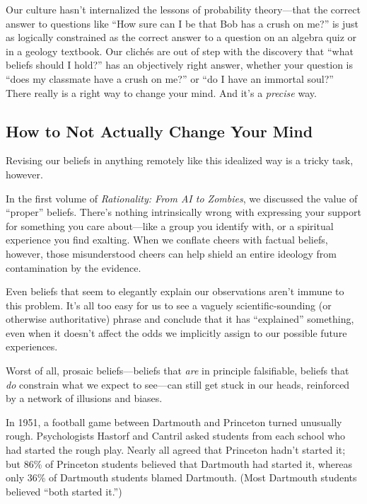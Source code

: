 {
 Our culture hasn't internalized the lessons of
probability theory---that the correct answer to questions like
``How sure can I be that Bob has a crush on
me?'' is just as logically constrained as the correct
answer to a question on an algebra quiz or in a geology textbook. Our
clichés are out of step with the discovery that ``what
beliefs should I hold?'' has an objectively right
answer, whether your question is ``does my classmate
have a crush on me?'' or ``do I have
an immortal soul?'' There really is a right way to
change your mind. And it's a \textit{precise} way.}


\subsection{How to Not Actually Change Your Mind}

{
 Revising our beliefs in anything remotely like this idealized way
is a tricky task, however.}

{
 In the first volume of \textit{Rationality: From AI to Zombies},
we discussed the value of ``proper''
beliefs. There's nothing intrinsically wrong with
expressing your support for something you care about---like a group you
identify with, or a spiritual experience you find exalting. When we
conflate cheers with factual beliefs, however, those misunderstood
cheers can help shield an entire ideology from contamination by the
evidence.}

{
 Even beliefs that seem to elegantly explain our observations
aren't immune to this problem. It's all
too easy for us to see a vaguely scientific-sounding (or otherwise
authoritative) phrase and conclude that it has
``explained'' something, even when
it doesn't affect the odds we implicitly assign to our
possible future experiences.}

{
 Worst of all, prosaic beliefs---beliefs that \textit{are} in
principle falsifiable, beliefs that \textit{do} constrain what we
expect to see---can still get stuck in our heads, reinforced by a
network of illusions and biases.}

{
 In 1951, a football game between Dartmouth and Princeton turned
unusually rough. Psychologists Hastorf and Cantril asked students from
each school who had started the rough play. Nearly all agreed that
Princeton hadn't started it; but 86\% of Princeton
students believed that Dartmouth had started it, whereas only 36\% of
Dartmouth students blamed Dartmouth. (Most Dartmouth students believed
``both started it.'')}


